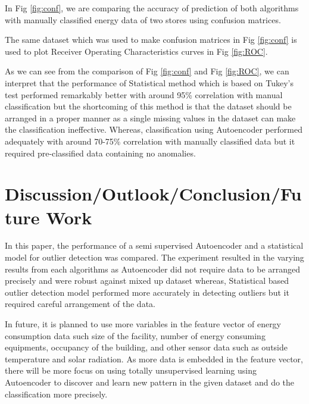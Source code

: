 \documentclass[conference]{IEEEtran}
\begin{document}
In Fig \ref{fig:conf}, we are comparing the accuracy of prediction of both algorithms with manually classified energy data of two stores using confusion matrices. 


The same dataset which was used to make confusion matrices in Fig \ref{fig:conf} is used to plot Receiver Operating Characteristics curves in Fig \ref{fig:ROC}.




As we can see from the comparison of Fig \ref{fig:conf} and Fig \ref{fig:ROC}, we can interpret that the performance of Statistical method which is based on Tukey's test performed remarkably better with around 95\% correlation with manual classification but the shortcoming of this method is that the dataset should be arranged in a proper manner as a single missing values in the dataset can make the classification ineffective. Whereas, classification using Autoencoder performed adequately with around 70-75\% correlation with manually classified data but it required pre-classified data containing no anomalies.  
 
 \section{Discussion/Outlook/Conclusion/Future Work}
 
 In this paper, the performance of a semi supervised Autoencoder and a statistical model for outlier detection was compared. The experiment resulted in the varying results from each algorithms as Autoencoder did not require data to be arranged precisely and were robust against mixed up dataset whereas, Statistical based outlier detection model performed more accurately in detecting outliers but it required careful arrangement of the data.
 
  
 In future, it is planned to use more variables in the feature vector of energy consumption data such size of the facility, number of energy consuming equipments, occupancy of the building, and other sensor data such as outside temperature and solar radiation. As more data is embedded in the feature vector, there will be more focus on using totally unsupervised learning using Autoencoder to discover and learn new pattern in the given dataset and do the classification more precisely. 
 
\end{document}

